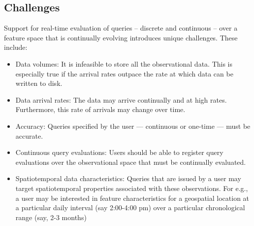\subsection{Challenges}
Support for real-time evaluation of queries – discrete and continuous – over a feature space that is continually evolving introduces unique challenges. These include:
\begin{itemize}
\item   Data volumes: It is infeasible to store all the observational data. This is especially true if the arrival rates outpace the rate at which data can be written to disk.
\item   Data arrival rates: The data may arrive continually and at high rates. Furthermore, this rate of arrivals may change over time.
\item   Accuracy: Queries specified by the user — continuous or one-time — must be accurate.
\item   Continuous query evaluations: Users should be able to register query evaluations over the observational space that must be continually evaluated.
\item   Spatiotemporal data characteristics: Queries that are issued by a user may target spatiotemporal properties associated with these observations. For e.g., a user may be interested in feature characteristics for a geospatial location at a particular daily interval (say 2:00-4:00 pm) over a particular chronological range (say, 2-3 months)
\end{itemize}

